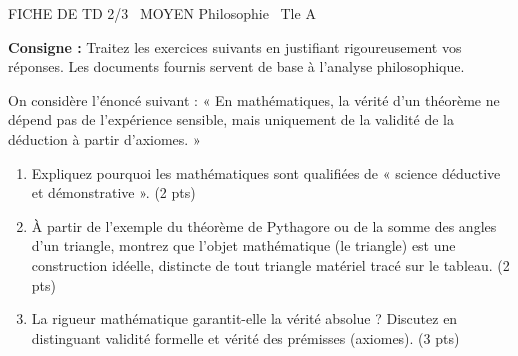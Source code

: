 \documentclass[11pt]{article}
\begin{document}
\begin{tcolorbox}[enhanced,colback=popink,colframe=popink,arc=10pt,boxrule=0pt,left=12pt,right=12pt,top=9pt,bottom=9pt]
{\color{white}\popxbold\small FICHE DE TD 2/3 \textbullet\ MOYEN \hfill Philosophie \textbullet\ Tle A\par}
\end{tcolorbox}
\vspace{4pt}
\textbf{Consigne :} Traitez les exercices suivants en justifiant rigoureusement vos réponses. Les documents fournis servent de base à l'analyse philosophique.

\begin{exercice}
On considère l'énoncé suivant : « En mathématiques, la vérité d'un théorème ne dépend pas de l'expérience sensible, mais uniquement de la validité de la déduction à partir d'axiomes. »
\begin{enumerate}
    \item Expliquez pourquoi les mathématiques sont qualifiées de « science déductive et démonstrative ». (2 pts)
    \item À partir de l'exemple du théorème de Pythagore ou de la somme des angles d'un triangle, montrez que l'objet mathématique (le triangle) est une construction idéelle, distincte de tout triangle matériel tracé sur le tableau. (2 pts)
    \item La rigueur mathématique garantit-elle la vérité absolue ? Discutez en distinguant validité formelle et vérité des prémisses (axiomes). (3 pts)
\end{enumerate}
\end{exercice}
\end{document}
